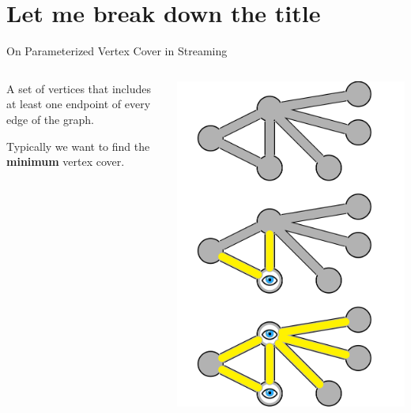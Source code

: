 \documentclass{beamer}
\begin{document}
\section{Let me break down the title}

\begin{frame}{On Parameterized \alert{Vertex Cover} in Streaming}
    \begin{columns}
        \begin{column}{0.6\textwidth}
            A set of vertices that includes at least one endpoint of every edge of the graph.

            \hfill

            Typically we want to find the \textbf{minimum} vertex cover.
        \end{column}
        \begin{column}{0.3\textwidth}
            \begin{center}
                \includegraphics[width=\textwidth]{vertex-cover}
            \end{center}
        \end{column}
    \end{columns}
\end{frame}
\end{document}
